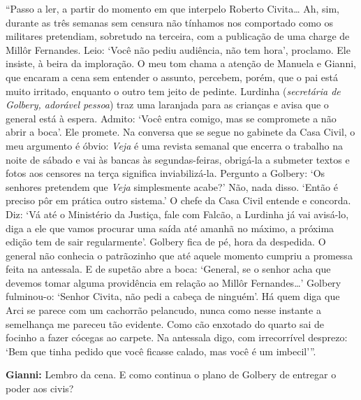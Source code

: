 ``Passo a ler, a partir do momento em que interpelo Roberto
Civita\ldots{} Ah, sim, durante as três semanas sem censura não tínhamos
nos comportado como os militares pretendiam, sobretudo na terceira, com
a publicação de uma charge de Millôr Fernandes. Leio: `Você não pediu
audiência, não tem hora', proclamo. Ele insiste, à beira da imploração.
O meu tom chama a atenção de Manuela e Gianni, que encaram a cena sem
entender o assunto, percebem, porém, que o pai está muito irritado,
enquanto o outro tem jeito de pedinte. Lurdinha (\emph{secretária de
Golbery, adorável pessoa}) traz uma laranjada para as crianças e avisa
que o general está à espera. Admito: `Você entra comigo, mas se
compromete a não abrir a boca'. Ele promete. Na conversa que se segue no
gabinete da Casa Civil, o meu argumento é óbvio: \emph{Veja} é uma
revista semanal que encerra o trabalho na noite de sábado e vai às
bancas às segundas-feiras, obrigá-la a submeter textos e fotos aos
censores na terça significa inviabilizá-la. Pergunto a Golbery: `Os
senhores pretendem que \emph{Veja} simplesmente acabe?' Não, nada disso.
`Então é preciso pôr em prática outro sistema.' O chefe da Casa Civil
entende e concorda. Diz: `Vá até o Ministério da Justiça, fale com
Falcão, a Lurdinha já vai avisá-lo, diga a ele que vamos procurar uma
saída até amanhã no máximo, a próxima edição tem de sair regularmente'.
Golbery fica de pé, hora da despedida. O general não conhecia o
patrãozinho que até aquele momento cumpriu a promessa feita na
antessala. E de supetão abre a boca: `General, se o senhor acha que
devemos tomar alguma providência em relação ao Millôr Fernandes\ldots{}'
Golbery fulminou-o: `Senhor Civita, não pedi a cabeça de ninguém'. Há
quem diga que Arci se parece com um cachorrão pelancudo, nunca como
nesse instante a semelhança me pareceu tão evidente. Como cão enxotado
do quarto sai de focinho a fazer cócegas ao carpete. Na antessala digo,
com irrecorrível desprezo: `Bem que tinha pedido que você ficasse
calado, mas você é um imbecil'''.

\textbf{Gianni:} Lembro da cena. E como continua o plano de Golbery de
entregar o poder aos civis?

